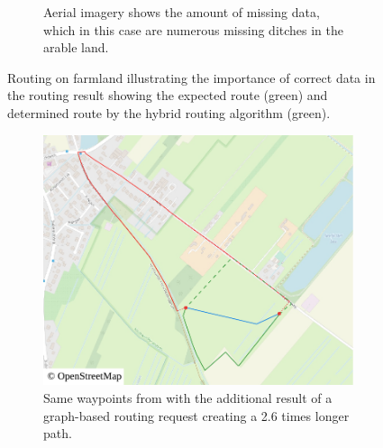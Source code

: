 \begin{figure}[h!]
\begin{minipage}[t]{.48\textwidth}
\begin{subfigure}[t]{\linewidth}
						\caption{Aerial imagery shows the amount of missing data, which in this case are numerous missing ditches in the arable land.}
						\label{fig:eval-rural-routing-6-aerial}
					\end{subfigure}
				\end{minipage}
				\caption[Illustration of routing problems and different weight-function values.]{Routing on farmland illustrating the importance of correct data in the routing result showing the expected route (green) and determined route by the hybrid routing algorithm (green).}
				\label{fig:eval-rural-routing-6}
			\end{figure}
			
			\begin{figure}[h!]
				\begin{minipage}[t]{.48\textwidth}
					\begin{subfigure}[t]{\linewidth}
						\includegraphics[width=\textwidth]{images/qgis-routing-rural-routing-6-graph-based}
						\caption{Same waypoints from  with the additional result of a graph-based routing request creating a 2.6 times longer path.}
						\label{fig:eval-rural-graph-based-comparison-6}
					\end{subfigure}
				\end{minipage}
				\hfill
				\begin{minipage}[t]{.48\textwidth}
					\begin{subfigure}[t]{\linewidth}

\end{subfigure}
\end{minipage}
\end{figure}
